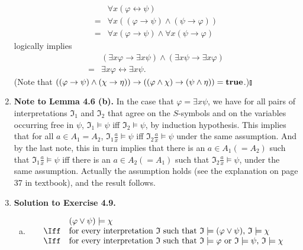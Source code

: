 \begin{enumerate}[1.]
\[
\begin{array}{ll}
\,  & \forall x (\varphi \leftrightarrow \psi) \\
=  & \forall x ( (\varphi \rightarrow \psi) \land (\psi \rightarrow \varphi) ) \\
=  & \forall x (\varphi \rightarrow \psi) \land \forall x (\psi \rightarrow \varphi)
\end{array}
\]
logically implies
\[
\begin{array}{ll}
\,  & (\exists x \varphi \rightarrow \exists x \psi) \land (\exists x \psi \rightarrow \exists x \varphi) \\
= & \exists x \varphi \leftrightarrow \exists x \psi.
\end{array}
\]
(Note that $( (\varphi \rightarrow \psi) \land (\chi \rightarrow \eta) ) \rightarrow ( (\varphi \land \chi) \rightarrow (\psi \land \eta) ) = \mbox{\bf true}$.)\nolinebreak\hfill$\talloblong$
%
\item \textbf{Note to Lemma 4.6 (b).} In the case that $\varphi = \exists x \psi$, we have for all pairs of interpretations $\mathfrak{I}_1$ and $\mathfrak{I}_2$ that agree on the $S$-symbols and on the variables occurring free in $\psi$, $\mathfrak{I}_1 \models \psi$ iff $\mathfrak{I}_2 \models \psi$, by induction hypothesis. This implies that for all $a \in A_1 = A_2$, $\mathfrak{I}_1 \frac{a}{x} \models \psi$ iff $\mathfrak{I}_2 \frac{a}{x} \models \psi$ under the same assumption. And by the last note, this in turn implies that there is an $a \in A_1 (= A_2)$ such that $\mathfrak{I}_1 \frac{a}{x} \models \psi$ iff there is an $a \in A_2 (= A_1)$ such that $\mathfrak{I}_2 \frac{a}{x} \models \psi$, under the same assumption. Actually the assumption holds (see the explanation on page 37 in textbook), and the result follows.
%
\item \textbf{Solution to Exercise 4.9.}
\begin{enumerate}[(a)]
\item 
\[
\begin{array}{ll}
\,  & (\varphi \lor \psi) \models \chi \\
\Iff & \mbox{for every interpretation $\mathfrak{I}$ such that $\mathfrak{I} \models (\varphi \lor \psi)$, $\mathfrak{I} \models \chi$} \\
\Iff & \mbox{for every interpretation $\mathfrak{I}$ such that $\mathfrak{I} \models \varphi$ or $\mathfrak{I} \models \psi$, $\mathfrak{I} \models \chi$} \\

\end{array}\]
\end{enumerate}
\end{enumerate}
